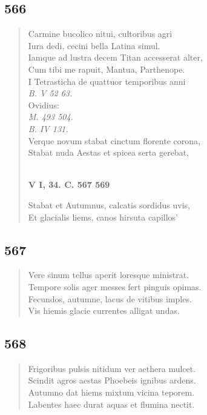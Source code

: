 \documentclass[11pt, a4paper]{report}
\begin{document}
            \subsection*{566}
      \begin{verse}
      Carmine bucolico nitui, cultoribus agri \\ Iura dedi, cecini bella Latina simul. \\ Iamque ad lustra decem Titan accesserat alter, \\ Cum tibi me rapuit, Mantua, Parthenope. \\ I Tetrasticha de quattuor temporibus anni \\ \textit{B. V 52 63.} \\ Ovidius: \\ \textit{M. 493 504.} \\ \textit{B. IV 131.} \\ Verque novum stabat cinctum florente corona, \\ Stabat nuda Aestas et spicea serta gerebat, \\ 
        ﻿\pagebreak 
     \marginpar{[76]} \begin{center} \textbf{V I, 34. C. 567 569} \end{center}Stabat et Autumnus, calcatis sordidus uvis, \\ Et glacialis liems, canos hirsuta capillos’ \\ 
      \end{verse}
  
            \subsection*{567}
      \begin{verse}
      Vere sinum tellus aperit loresque ministrat. \\ Tempore solis ager messes fert pinguis opimas. \\ Fecundos, autumne, lacus de vitibus imples. \\ Vis hiemis glacie currentes alligat undas. \\ 
      \end{verse}
  
            \subsection*{568}
      \begin{verse}
      Frigoribus pulsis nitidum ver aethera mulcet. \\ Scindit agros aestas Phoebeis ignibus ardens. \\ Autumno dat hiems mixtum vicina teporem. \\ Labentes haec durat aquas et flumina nectit. \\ 
      \end{verse}
  
\end{document}
